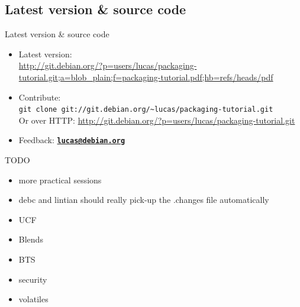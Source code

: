 \documentclass[10pt,final]{beamer}
\begin{document}
\subsection{Latest version \& source code}
\begin{frame}{Latest version \& source code}
  \begin{itemize}
  \item Latest version:\\
    {\footnotesize \url{http://git.debian.org/?p=users/lucas/packaging-tutorial.git;a=blob\_plain;f=packaging-tutorial.pdf;hb=refs/heads/pdf}}
  \end{itemize}
  
  \begin{itemize}
  \item Contribute:\\
    \texttt{git clone git://git.debian.org/\~{}lucas/packaging-tutorial.git}\\
    \hbr
    Or over HTTP: \url{http://git.debian.org/?p=users/lucas/packaging-tutorial.git}
    \br
  \item Feedback: \href{mailto:lucas@debian.org}{\textbf{\texttt{lucas@debian.org}}}
  \end{itemize}
\end{frame}

\backupbegin

\begin{frame}{TODO}
  \begin{itemize}
  \item more practical sessions
  \item debc and lintian should really pick-up the .changes file automatically
  \item UCF
  \item Blends
  \item BTS
  \item security
  \item volatiles
  \end{itemize}
\end{frame}
\end{document}
